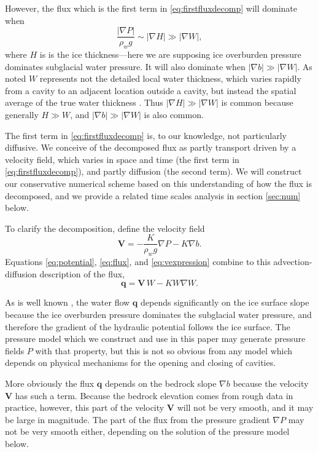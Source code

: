 \documentclass[11pt,final]{amsart}%
\newcommand\bV{\mathbf{V}}
\newcommand\bq{\mathbf{q}}
\newcommand{\grad}{\nabla}
\begin{document}
However, the flux which is the first term in \eqref{eq:firstfluxdecomp} will dominate when
    $$\frac{|\grad P|}{\rho_w g} \sim |\grad H| \gg |\grad W|,$$
where $H$ is is the ice thickness---here we are supposing ice overburden pressure dominates subglacial water pressure.  It will also dominate when $|\grad b| \gg |\grad W|$.  As noted $W$ represents not the detailed local water thickness, which varies rapidly from a cavity to an adjacent location outside a cavity, but instead the spatial average of the true water thickness \citep{Schoofetal2012}.  Thus $|\grad H| \gg |\grad W|$ is common because generally $H\gg W$, and $|\grad b| \gg |\grad W|$ is also common.

The first term in \eqref{eq:firstfluxdecomp} is, to our knowledge, not particularly diffusive.  We conceive of the decomposed flux as partly transport driven by a velocity field, which varies in space and time (the first term in \eqref{eq:firstfluxdecomp}), and partly diffusion (the second term).  We will construct our conservative numerical scheme based on this understanding of how the flux is decomposed, and we provide a related time scales analysis in section \ref{sec:num} below.

To clarify the decomposition, define the velocity field
\begin{equation} \label{eq:vexpression}
  \bV = - \frac{K}{\rho_w g} \grad P - K \grad b.
\end{equation}
Equations \eqref{eq:potential}, \eqref{eq:flux}, and \eqref{eq:vexpression} combine to this advection-diffusion description of the flux,
\begin{equation} \label{eq:qexpression}
  \bq = \bV\, W - K W \grad W.
\end{equation}

As is well known \citep{Clarke05}, the water flow $\bq$ depends significantly on the ice surface slope because the ice overburden pressure dominates the subglacial water pressure, and therefore the gradient of the hydraulic potential follows the ice surface.  The pressure model which we construct and use in this paper may generate pressure fields $P$ with that property, but this is not so obvious from any model which depends on physical mechanisms for the opening and closing of cavities.

More obviously the flux $\bq$ depends on the bedrock slope $\grad b$ because the velocity $\bV$ has such a term.  Because the bedrock elevation comes from rough data in practice, however, this part of the velocity $\bV$ will not be very smooth, and it may be large in magnitude.  The part of the flux from the pressure gradient $\grad P$ may not be very smooth either, depending on the solution of the pressure model below.
\end{document}
